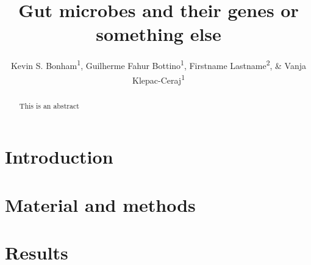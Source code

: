 \documentclass[a4paper]{article}
\title{Gut microbes and their genes or something else}
\author{Kevin S. Bonham\textsuperscript{1}, \space
Guilherme Fahur Bottino\textsuperscript{1}, 
Firstname Lastname\textsuperscript{2}, \&
Vanja Klepac-Ceraj\textsuperscript{1}
}
\begin{document}
\begin{abstract}
This is an abstract
\end{abstract}


\section*{Introduction}



\section*{Material and methods}



\section*{Results}


\end{document}
